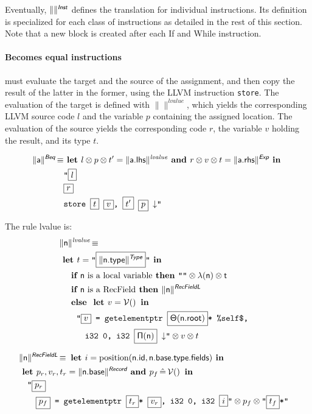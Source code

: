 \documentclass{llncs}
\newcommand{\trad}[2]{\ensuremath{\lVert \textsf{#1} \rVert^{\textit{#2}}}}
\newcommand{\nl}[0]{\ensuremath{\downarrow}}
\DeclareMathOperator{\isdef}{\equiv}
\DeclareMathOperator{\variable}{\mathcal{V}()}
\newcommand{\llvm}[1]{\texttt{#1}}
\newcommand{\B}[1]{\textsf{#1}}
\newcommand{\IF}[0]{\textbf{ if }}
\newcommand{\ELSE}[0]{\textbf{ else }}
\newcommand{\THEN}[0]{\textbf{ then }}
\newcommand{\LET}[0]{\textbf{ let }}
\DeclareMathOperator{\BE}{\hat{=}}
\newcommand{\IN}[0]{\textbf{ in }}
\newcommand{\AND}[0]{\textbf{ and }}
\newcommand{\PH}[1]{\framebox{$#1$}}
\newcommand{\sep}[0]{\otimes}
\newcommand{\local}[0]{\ensuremath{\sf\lambda}}
\newcommand{\idx}[0]{\ensuremath{\sf\Pi}}
\newcommand{\state}[0]{\ensuremath{\sf\Theta}}
\begin{document}
Eventually, $\trad{}{\B{Inst}}$ defines the translation for individual
instructions. Its definition is specialized for each class of instructions as
detailed in the rest of this section. Note that a new block is created after
each \B{If} and \B{While} instruction.

\paragraph{Becomes equal instructions} must evaluate the
 target and the source of the assignment, and then copy the result of the 
latter in the former, using the LLVM instruction \llvm{store}. The evaluation 
of the target is defined with $\trad{}{lvalue}$, which yields the corresponding 
LLVM source code $l$ and the variable $p$ containing the assigned location. The 
evaluation of the source yields the corresponding code $r$, the variable $v$ 
holding the result, and its type $t$.

\begin{align*}
\begin{split}
  \trad{a}{\B{Beq}} \isdef
  & \LET l \sep p \sep t'= \trad{a.lhs}{lvalue} \AND r \sep v \sep t = \trad{a.rhs}{\B{Exp}} \IN \\
  & \llvm{"\PH{l}} \\
  & \llvm{\PH{r}} \\
  & \llvm{store \PH{t} \PH{v}, \PH{t'} \PH{p} \nl"}
\end{split}
\end{align*}

The rule lvalue is:
\begin{align*}
\lefteqn{\trad{n}{lvalue} \isdef} \\
& \LET t = \llvm{"\PH{\trad{\B{n.type}}{\B{Type}}}"} \IN \\
& \quad \IF \mbox{\B{n} is a local variable} \THEN \llvm{""} \sep \local(\B{n}) \sep t \\
& \quad \IF \mbox{\B{n} is a RecField} \THEN  \trad{n}{\B{RecFieldL}} \\
& \quad \ELSE \LET v = \variable \IN \\
& \quad \quad \llvm{"\PH{v} = getelementptr \PH{\state(\B{n.root})}* \%self\$,} \\
& \quad \quad \quad \llvm{i32 0, i32 \PH{\idx(\B{n})} \nl"} \sep v \sep t
\end{align*}

\begin{align*}
\lefteqn{\trad{n}{\B{RecFieldL}} \isdef \LET i = \text{position}(\B{n.id}, \B{n.base.type.fields}) \IN} \\
& \LET p_r, v_r, t_r = \trad{\B{n.base}}{\B{Record}} \AND p_f \BE \variable \IN \\
& \quad \llvm{"\PH{p_r}} \\
& \quad \quad \llvm{\PH{p_f} = getelementptr \PH{t_r}* \PH{v_r}, i32 0, i32 \PH{i}"} \sep p_f \sep \llvm{"\PH{t_f}*"}
\end{align*}
\end{document}
